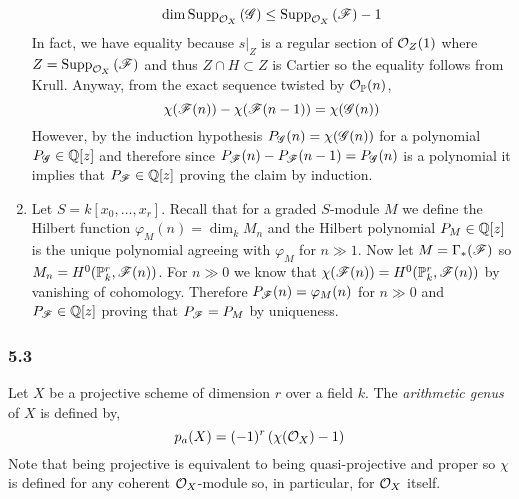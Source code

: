 \documentclass[12pt]{article}
\begin{document}
\begin{enumerate}
\[ \dim \mathrm{Supp}_{\mathcal{O}_{X}}\left(\mathscr{G} \right) \le \mathrm{Supp}_{\mathcal{O}_{X}}\left(\mathscr{F} \right) - 1 \]
In fact, we have equality because $s|_Z$ is a regular section of $\mathcal{O}_{Z}(1)$ where $Z = \mathrm{Supp}_{\mathcal{O}_{X}}\left(\mathscr{F} \right)$ and thus $Z \cap H \subset Z$ is Cartier so the equality follows from Krull. Anyway, from the exact sequence twisted by $\mathcal{O}_{\mathbb{P}}(n)$,
\[ \chi(\mathscr{F}(n)) - \chi(\mathscr{F}(n-1)) = \chi(\mathscr{G}(n)) \]
However, by the induction hypothesis $P_{\mathscr{G}}(n) = \chi(\mathscr{G}(n))$ for a polynomial $P_{\mathscr{G}} \in \mathbb{Q}[z]$ and therefore since $P_{\mathscr{F}}(n) - P_{\mathscr{F}}(n-1) = P_{\mathscr{G}}(n)$ is a polynomial it implies that $P_{\mathscr{F}} \in \mathbb{Q}[z]$ proving the claim by induction.

\item Let $S = k[x_0, \dots, x_r]$. Recall that for a graded $S$-module $M$ we define the Hilbert function $\varphi_M(n) = \dim_k M_n$ and the Hilbert polynomial $P_M \in \mathbb{Q}[z]$ is the unique polynomial agreeing with $\varphi_M$ for $n \gg 1$. Now let $M = \Gamma_*(\mathscr{F})$ so $M_n = H^0(\mathbb{P}^r_k, \mathscr{F}(n))$. For $n \gg 0$ we know that $\chi(\mathscr{F}(n)) = H^0(\mathbb{P}^r_k, \mathscr{F}(n))$ by vanishing of cohomology. Therefore $P_{\mathscr{F}}(n) = \varphi_M(n)$ for $n \gg 0$ and $P_{\mathscr{F}} \in \mathbb{Q}[z]$ proving that $P_{\mathscr{F}} = P_M$ by uniqueness. 
\end{enumerate}

\subsubsection{5.3}

Let $X$ be a projective scheme of dimension $r$ over a field $k$. The \textit{arithmetic genus} of $X$ is defined by,
\[ p_a(X) = (-1)^r \left( \chi(\mathcal{O}_{X}) - 1 \right) \]
Note that being projective is equivalent to being quasi-projective and proper so $\chi$ is defined for any coherent $\mathcal{O}_{X}$-module so, in particular, for $\mathcal{O}_{X}$ itself. 
 
\end{document}
